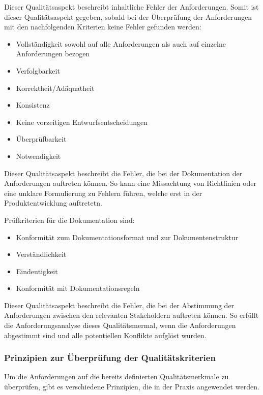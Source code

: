 Dieser Qualitätsaspekt beschreibt inhaltliche Fehler der Anforderungen.
Somit ist dieser Qualitätsaspekt gegeben, sobald bei der Überprüfung der Anforderungen mit den nachfolgenden Kriterien keine Fehler gefunden werden:
\begin{itemize}
    \item Vollständigkeit sowohl auf alle Anforderungen als auch auf einzelne Anforderungen bezogen
    \item Verfolgbarkeit
    \item Korrektheit/Adäquatheit
    \item Konsistenz
    \item Keine vorzeitigen Entwurfsentscheidungen
    \item Überprüfbarkeit
    \item Notwendigkeit
\end{itemize}\autocite[vgl.][Seite 19f]{Maulhardt.c}

Dieser Qualitätsaspekt beschreibt die Fehler, die bei der Dokumentation der Anforderungen auftreten können.
So kann eine Missachtung von Richtlinien oder eine unklare Formulierung zu Fehlern führen, welche erst in der Produktentwicklung auftretetn.

Prüfkriterien für die Dokumentation sind:
\begin{itemize}
    \item Konformität zum Dokumentationsformat und zur Dokumentenstruktur
    \item Verständlichkeit
    \item Eindeutigkeit
    \item Konformität mit Dokumentationsregeln
\end{itemize}\autocite[vgl.][Seite 21ff]{Maulhardt.c}

Dieser Qualitätsaspekt beschreibt die Fehler, die bei der Abstimmung der Anforderungen zwischen den relevanten Stakeholdern auftreten können.
So erfüllt die Anforderungsanalyse dieses Qualitätsmermal, wenn die Anforderungen abgestimmt sind und alle potentiellen Konflikte aufglöst wurden\autocite[vgl.][Seite 24]{Maulhardt.c}.

\subsubsection{Prinzipien zur Überprüfung der Qualitätskriterien}
Um die Anforderungen auf die bereits definierten Qualitätsmerkmale zu überprüfen, gibt es verschiedene Prinzipien, die in der Praxis angewendet werden.

